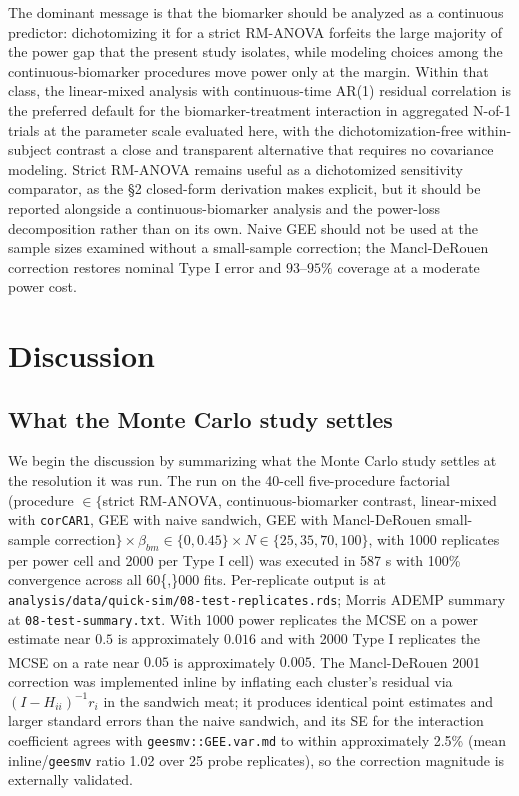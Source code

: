 \documentclass[
  11pt,
]{article}
\begin{document}
The dominant message is that the biomarker should be analyzed as
a continuous predictor: dichotomizing it for a strict RM-ANOVA
forfeits the large majority of the power gap that the present
study isolates, while modeling choices among the
continuous-biomarker procedures move power only at the margin.
Within that class, the linear-mixed analysis with continuous-time
AR(1) residual correlation is the preferred default for the
biomarker-treatment interaction in aggregated N-of-1 trials at
the parameter scale evaluated here, with the dichotomization-free
within-subject contrast a close and transparent alternative that
requires no covariance modeling. Strict RM-ANOVA remains useful
as a dichotomized sensitivity comparator, as the \S2 closed-form
derivation makes explicit, but it should be reported alongside a
continuous-biomarker analysis and the power-loss decomposition
rather than on its own. Naive GEE should not be used at the
sample sizes examined without a small-sample correction; the
Mancl-DeRouen correction restores nominal Type I error and
\(93\)--\(95\%\) coverage at a moderate power cost.

\section{Discussion}\label{discussion}

\subsection{What the Monte Carlo study settles}\label{what-the-monte-carlo-study-settles}

We begin the discussion by summarizing what the Monte Carlo study
settles at the resolution it was run. The run on the 40-cell
five-procedure factorial (procedure \(\in \{\)strict RM-ANOVA,
continuous-biomarker contrast, linear-mixed with \texttt{corCAR1}, GEE
with naive sandwich, GEE with Mancl-DeRouen small-sample
correction\(\} \times \beta_{bm} \in \{0, 0.45\} \times N \in
\{25, 35, 70, 100\}\), with 1000 replicates per power cell and
2000 per Type I cell) was executed in 587 s with 100\%
convergence across all 60\{,\}000 fits. Per-replicate output is at
\texttt{analysis/data/quick-sim/08-test-replicates.rds}; Morris ADEMP
summary at \texttt{08-test-summary.txt}. With 1000 power replicates the
MCSE on a power estimate near \(0.5\) is approximately \(0.016\) and
with 2000 Type I replicates the MCSE on a rate near \(0.05\) is
approximately \(0.005\). The Mancl-DeRouen 2001\textsuperscript{} correction was implemented inline by
inflating each cluster's residual via \((I - H_{ii})^{-1} r_i\) in
the sandwich meat; it produces identical point estimates and
larger standard errors than the naive sandwich, and its SE for
the interaction coefficient agrees with \texttt{geesmv::GEE.var.md} to
within approximately 2.5\% (mean inline/\texttt{geesmv} ratio 1.02 over
25 probe replicates), so the correction magnitude is externally
validated.
\end{document}
